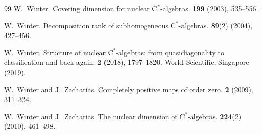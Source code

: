 \documentclass[11pt,a4paper]{amsart}
\theoremstyle{definition}
\numberwithin{equation}{section}
\begin{document}
\begin{thebibliography}{99}
W.\ Winter.
\newblock Covering dimension for nuclear $\mathrm{C}^\ast$-algebras.
 {\bf 199} (2003), 535--556.

W.\ Winter.
\newblock Decomposition rank of subhomogeneous $\mathrm{C}^\ast$-algebras.
 {\bf 89}(2) (2004), 427--456.

W.\ Winter.
\newblock Structure of nuclear $\mathrm{C}^*$-algebras: from quasidiagonality to classification and back again.
 {\bf 2} (2018), 1797--1820. World Scientific, Singapore (2019).



W.\ Winter and J.\ Zacharias.
\newblock Completely positive maps of order zero.
 {\bf 2} (2009), 311--324.

W.\ Winter and J.\ Zacharias.
\newblock The nuclear dimension of $\mathrm{C}^*$-algebras.
 {\bf 224}(2) (2010), 461--498.


\end{thebibliography}
\end{document}
